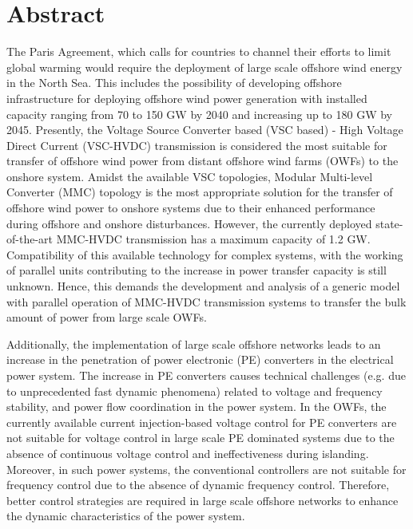 \chapter*{Abstract}



The Paris Agreement, which calls for countries to channel their efforts to limit global warming would require the deployment of large scale offshore wind energy in the North Sea. This includes the possibility of developing offshore infrastructure for deploying offshore wind power generation with installed capacity ranging from 70 to 150 GW by 2040 and increasing up to 180 GW by 2045. Presently, the Voltage Source Converter based (VSC based) - High Voltage Direct Current (VSC-HVDC) transmission is considered the most suitable for transfer of offshore wind power from distant offshore wind farms (OWFs) to the onshore system. Amidst the available VSC topologies, Modular Multi-level Converter (MMC) topology is the most appropriate solution for the transfer of offshore wind power to onshore systems due to their enhanced performance during offshore and onshore disturbances. However, the currently deployed state-of-the-art MMC-HVDC transmission has a maximum capacity of 1.2 GW. Compatibility of this available technology for complex systems, with the working of parallel units contributing to the increase in power transfer capacity is still unknown. Hence, this demands the development and analysis of a generic model with parallel operation of MMC-HVDC transmission systems to transfer the bulk amount of power from large scale OWFs. 

Additionally, the implementation of large scale offshore networks leads to an increase in the penetration of power electronic (PE) converters in the electrical power system. The increase in PE converters causes technical challenges (e.g. due to unprecedented fast dynamic phenomena) related to voltage and frequency stability, and power flow coordination in the power system. In the OWFs, the currently available current injection-based voltage control for PE converters are not suitable for voltage control in large scale PE dominated systems due to the absence of continuous voltage control and ineffectiveness during islanding. Moreover, in such power systems, the conventional controllers are not suitable for frequency control due to the absence of dynamic frequency control. Therefore, better control strategies are required in large scale offshore networks to enhance the dynamic characteristics of the power system. 

